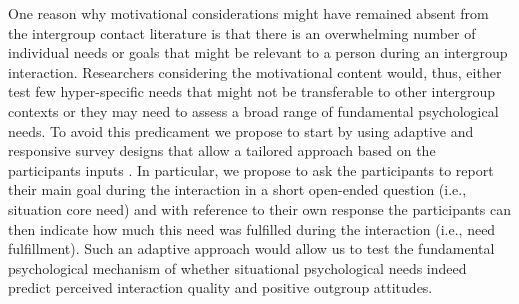\documentclass[man, 12pt, a4paper]{apa7}
\theoremstyle{break}
\theoremstyle{plain}
\begin{document}
One reason why motivational considerations might have remained absent from the intergroup contact literature is that there is an overwhelming number of individual needs or goals that might be relevant to a person during an intergroup interaction. Researchers considering the motivational content would, thus, either test few hyper-specific needs that might not be transferable to other intergroup contexts or they may need to assess a broad range of fundamental psychological needs. To avoid this predicament we propose to start by using adaptive and responsive survey designs that allow a tailored approach based on the participants inputs \citep[e.g.,][]{Tourangeau2017}. In particular, we propose to ask the participants to report their main goal during the interaction in a short open-ended question (i.e., situation core need) and with reference to their own response the participants can then indicate how much this need was fulfilled during the interaction (i.e., need fulfillment). Such an adaptive approach would allow us to test the fundamental psychological mechanism of whether situational psychological needs indeed predict perceived interaction quality and positive outgroup attitudes. 
\end{document}
